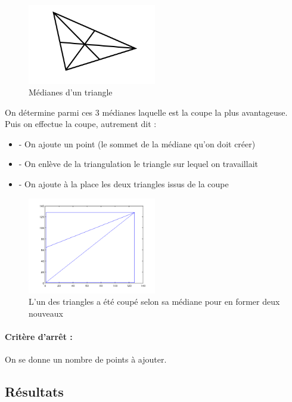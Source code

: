 \documentclass{report}
\begin{document}
\begin{figure}[ht]
\centering
\includegraphics[width=0.5\textwidth]{triangle.png}
\caption{Médianes d'un triangle}
\end{figure}

On détermine parmi ces 3 médianes laquelle est la coupe la plus avantageuse. Puis on effectue la coupe, autrement dit :
\begin{itemize}
	\item - On ajoute un point (le sommet de la médiane qu'on doit créer)
	\item - On enlève de la triangulation le triangle sur lequel on travaillait
	\item - On ajoute à la place les deux triangles issus de la coupe
\end{itemize}


\begin{figure}[ht]
\centering
\includegraphics[width=0.5\textwidth]{beginBissect2.png}
\caption{L'un des triangles a été coupé selon sa médiane pour en former deux nouveaux}
\end{figure}

\paragraph{Critère d'arrêt :}
On se donne un nombre de points à ajouter.

\subsection{Résultats}
\end{document}
